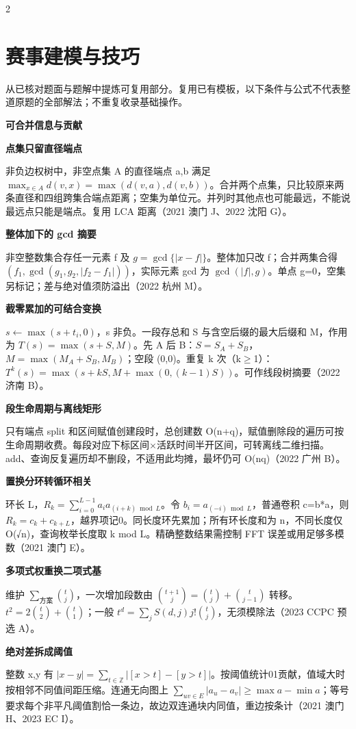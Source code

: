 \documentclass[UTF8,fontset=fandol,a4paper,twoside]{ctexart}
\newcommand{\topic}[1]{\par\smallskip\textbf{#1}\par\nobreak}
\newcommand{\note}[1]{{\fontsize{10}{12}\selectfont #1\par}}
\begin{document}
\begin{multicols}{2}
\section{赛事建模与技巧}
\note{从已核对题面与题解中提炼可复用部分。复用已有模板，以下条件与公式不代表整道原题的全部解法；不重复收录基础操作。}
\topic{可合并信息与贡献}
\par\textbf{点集只留直径端点}\quad
\note{非负边权树中，非空点集 A 的直径端点 a,\allowbreak{}b 满足 $\max_{x\in A}d(v,x)=\max(d(v,a),d(v,b))$。合并两个点集，只比较原来两条直径和四组跨集合端点距离；空集为单位元。并列时其他点也可能最远，不能说最远点只能是端点。复用 LCA 距离（2021 澳门 J、2022 沈阳 G）。}
\par\textbf{整体加下的 gcd 摘要}\quad
\note{非空整数集合存任一元素 f 及 $g=\gcd\{|x-f|\}$。整体加只改 f；合并两集合得 $(f_1,\gcd(g_1,g_2,|f_2-f_1|))$，实际元素 gcd 为 $\gcd(|f|,g)$。单点 g=\allowbreak{}0，空集另标记；差与绝对值须防溢出（2022 杭州 M）。}
\par\textbf{截零累加的可结合变换}\quad
\note{$s\gets\max(s+t_i,0)$，s 非负。一段存总和 S 与含空后缀的最大后缀和 M，作用为 $T(s)=\max(s+S,M)$。先 A 后 B：$S=S_A+S_B$，$M=\max(M_A+S_B,M_B)$；空段 (\allowbreak{}0,\allowbreak{}0)\allowbreak{}。重复 k 次（k\ensuremath{\ge}1）：$T^k(s)=\max(s+kS,M+\max(0,(k-1)S))$。可作线段树摘要（2022 济南 B）。}
\par\textbf{段生命周期与离线矩形}\quad
\note{只有端点 split 和区间赋值创建段时，总创建数 O(\allowbreak{}n+\allowbreak{}q)\allowbreak{}，赋值删除段的遍历可按生命周期收费。每段对应下标区间\ensuremath{\times}活跃时间半开区间，可转离线二维扫描。add、查询反复遍历却不删段，不适用此均摊，最坏仍可 O(\allowbreak{}nq)\allowbreak{}（2022 广州 B）。}
\par\textbf{置换分环转循环相关}\quad
\note{环长 L，$R_k=\sum_{i=0}^{L-1}a_i a_{(i+k)\bmod L}$。令 $b_i=a_{(-i)\bmod L}$，普通卷积 c=\allowbreak{}b*a，则 $R_k=c_k+c_{k+L}$，越界项记0。同长度环先累加；所有环长度和为 n，不同长度仅 O(\allowbreak{}√n)\allowbreak{}，查询枚举长度取 k mod L。精确整数结果需控制 FFT 误差或用足够多模数（2021 澳门 E）。}
\par\textbf{多项式权重换二项式基}\quad
\note{维护 $\sum_{\text{方案}}\binom tj$，一次增加段数由 $\binom{t+1}j=\binom tj+\binom t{j-1}$ 转移。$t^2=2\binom t2+\binom t1$；一般 $t^d=\sum_j S(d,j)j!\binom tj$，无须模除法（2023 CCPC 预选 A）。}
\par\textbf{绝对差拆成阈值}\quad
\note{整数 x,\allowbreak{}y 有 $|x-y|=\sum_{t\in\mathbb Z}|[x>t]-[y>t]|$。按阈值统计01贡献，值域大时按相邻不同值间距压缩。连通无向图上 $\sum_{uv\in E}|a_u-a_v|\ge\max a-\min a$；等号要求每个非平凡阈值割恰一条边，故边双连通块内同值，重边按条计（2021 澳门 H、2023 EC I）。}

\end{multicols}
\end{document}
